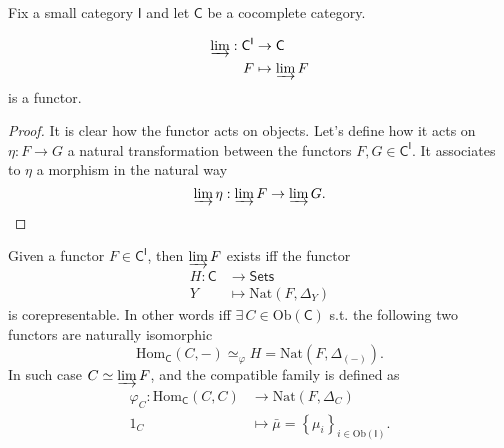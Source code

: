 Fix a small category $\mathsf{I}$ and let $\mathsf{C}$ be a cocomplete category.
\begin{prop}
	\begin{align}
		\varinjlim: \mathsf{C}^{\mathsf{I}} &\to \mathsf{C} \\
		F &\mapsto \varinjlim F
	\end{align} 
	is a functor.
\end{prop} 
\begin{proof}
	It is clear how the functor acts on objects.
	Let's define how it acts on $\eta: F \to G$ a natural transformation between the functors $F, G \in \mathsf{C}^{\mathsf{I}}$.
	It associates to $\eta$ a morphism in the natural way
	\begin{equation}
	\varinjlim \eta: \varinjlim F \to \varinjlim G
	.\end{equation} 
\end{proof}

\begin{prop}
	Given a functor $F \in \mathsf{C}^{\mathsf{I}}$, then $\varinjlim F$ exists iff the functor
	\begin{align}
		H: \mathsf{C} &\to \mathsf{Sets} \\
		Y &\mapsto \mathrm{Nat} \left( F, \Delta_Y \right)
	\end{align} 
	is corepresentable.
	In other words iff $\exists\, C \in \mathrm{Ob} \left(\mathsf{C}\right)$ s.t.
	the following two functors are naturally isomorphic
	\begin{equation}
		\mathrm{Hom}_{\mathsf{C}} \left( C, - \right) \simeq_{\varphi} H = \mathrm{Nat} \left( F, \Delta_{(-)} \right)
	.\end{equation} 
	In such case $C \simeq \varinjlim F$, and the compatible family is defined as
	\begin{align}
		\varphi_C: \mathrm{Hom}_{\mathsf{C}} \left( C, C \right) &\to \mathrm{Nat} \left( F, \Delta_C \right) \\
		1_C &\mapsto \bar{\mu} = \left\{ \mu_i \right\}_{i \in \mathrm{Ob} \left(\mathsf{I}\right)} 
	.\end{align} 
\end{prop} 

